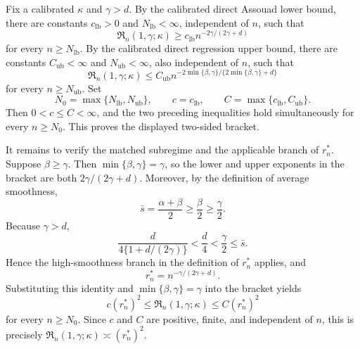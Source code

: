 Fix a calibrated \(\kappa\) and \(\gamma>d\). By the calibrated direct Assouad lower bound, there are constants \(c_{\mathrm{lb}}>0\) and \(N_{\mathrm{lb}}<\infty\), independent of \(n\), such that
\[
\mathfrak R_n(1,\gamma;\kappa)\ge c_{\mathrm{lb}}n^{-2\gamma/(2\gamma+d)}
\]
for every \(n\ge N_{\mathrm{lb}}\). By the calibrated direct regression upper bound, there are constants \(C_{\mathrm{ub}}<\infty\) and \(N_{\mathrm{ub}}<\infty\), also independent of \(n\), such that
\[
\mathfrak R_n(1,\gamma;\kappa)
\le C_{\mathrm{ub}}n^{-2\min\{\beta,\gamma\}/\{2\min\{\beta,\gamma\}+d\}}
\]
for every \(n\ge N_{\mathrm{ub}}\). Set
\[
N_0=\max\{N_{\mathrm{lb}},N_{\mathrm{ub}}\},\qquad
c=c_{\mathrm{lb}},\qquad
C=\max\{c_{\mathrm{lb}},C_{\mathrm{ub}}\}.
\]
Then \(0<c\le C<\infty\), and the two preceding inequalities hold simultaneously for every \(n\ge N_0\). This proves the displayed two-sided bracket.

It remains to verify the matched subregime and the applicable branch of \(r_n^*\). Suppose \(\beta\ge\gamma\). Then \(\min\{\beta,\gamma\}=\gamma\), so the lower and upper exponents in the bracket are both \(2\gamma/(2\gamma+d)\). Moreover, by the definition of average smoothness,
\[
\bar s=\frac{\alpha+\beta}{2}\ge\frac{\beta}{2}\ge\frac{\gamma}{2}.
\]
Because \(\gamma>d\),
\[
\frac{d}{4\{1+d/(2\gamma)\}}
<\frac d4
<\frac\gamma2
\le\bar s.
\]
Hence the high-smoothness branch in the definition of \(r_n^*\) applies, and
\[
r_n^*=n^{-\gamma/(2\gamma+d)}.
\]
Substituting this identity and \(\min\{\beta,\gamma\}=\gamma\) into the bracket yields
\[
c(r_n^*)^2
\le\mathfrak R_n(1,\gamma;\kappa)
\le C(r_n^*)^2
\]
for every \(n\ge N_0\). Since \(c\) and \(C\) are positive, finite, and independent of \(n\), this is precisely \(\mathfrak R_n(1,\gamma;\kappa)\asymp(r_n^*)^2\).